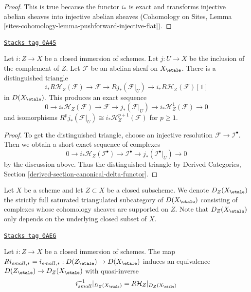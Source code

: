 \begin{proof}
This is true because the functor $i_*$ is exact and transforms
injective abelian sheaves into injective abelian sheaves
(Cohomology on Sites, Lemma
\ref{sites-cohomology-lemma-pushforward-injective-flat}).
\end{proof}

\begin{lemma}
\label{etale-cohomology-lemma-cohomology-with-support-triangle}
\href{https://stacks.math.columbia.edu/tag/0A45}{\texttt{Stacks tag 0A45}}

Let $i : Z \to X$ be a closed immersion of schemes.
Let $j : U \to X$ be the inclusion of the complement of $Z$.
Let $\mathcal{F}$ be an abelian sheaf on $X_\etale$.
There is a distinguished triangle
$$
i_*R\mathcal{H}_Z(\mathcal{F}) \to \mathcal{F} \to Rj_*(\mathcal{F}|_U) \to
i_*R\mathcal{H}_Z(\mathcal{F})[1]
$$
in $D(X_\etale)$. This produces an exact sequence
$$
0 \to i_*\mathcal{H}_Z(\mathcal{F}) \to \mathcal{F} \to
j_*(\mathcal{F}|_U) \to i_*\mathcal{H}^1_Z(\mathcal{F}) \to 0
$$
and isomorphisms
$R^pj_*(\mathcal{F}|_U) \cong i_*\mathcal{H}^{p + 1}_Z(\mathcal{F})$
for $p \geq 1$.
\end{lemma}

\begin{proof}
To get the distinguished triangle, choose an injective resolution
$\mathcal{F} \to \mathcal{I}^\bullet$. Then we obtain a short exact
sequence of complexes
$$
0 \to
i_*\mathcal{H}_Z(\mathcal{I}^\bullet) \to \mathcal{I}^\bullet
\to j_*(\mathcal{I}^\bullet|_U) \to 0
$$
by the discussion above. Thus the distinguished triangle by
Derived Categories, Section \ref{derived-section-canonical-delta-functor}.
\end{proof}

Let $X$ be a scheme and let $Z \subset X$ be a closed subscheme.
We denote $D_Z(X_\etale)$ the strictly full saturated triangulated
subcategory of $D(X_\etale)$ consisting of complexes whose cohomology
sheaves are supported on $Z$. Note that $D_Z(X_\etale)$ only
depends on the underlying closed subset of $X$.

\begin{lemma}
\label{etale-cohomology-lemma-complexes-with-support-on-closed}
\href{https://stacks.math.columbia.edu/tag/0AEG}{\texttt{Stacks tag 0AEG}}

Let $i : Z \to X$ be a closed immersion of schemes.
The map $Ri_{small, *} = i_{small, *} : D(Z_\etale) \to D(X_\etale)$
induces an equivalence $D(Z_\etale) \to D_Z(X_\etale)$ with quasi-inverse
$$
i_{small}^{-1}|_{D_Z(X_\etale)} = R\mathcal{H}_Z|_{D_Z(X_\etale)}
$$
\end{lemma}

